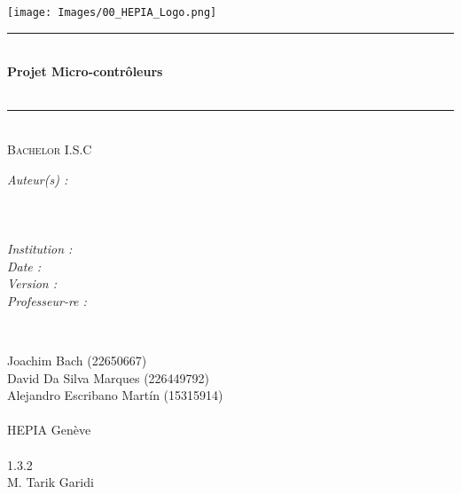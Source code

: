 \documentclass[french, 11pt]{article}
\title{\DocSubject}
\author{Joachim BACH ; David DA SILVA MARQUES}
\date{\today}
\makeatletter
\newcommand{\DocVersion}{1.3.2}
\newcommand{\DocTitle}{Projet Micro-contrôleurs}
\newcommand{\SubjectProfessor}{M. Tarik Garidi\xspace}
\let\TheTitle\@title
\let\TheDate\@date
\makeatother
\begin{document}
	
	\normalsize
	
	\begin{titlepage}
		
		\centering
		\vspace*{2.0 cm}
		
		\texttt{[image: Images/00\_HEPIA\_Logo.png]}\\[1.0 cm]
		
		\vspace{1.0 cm}
		
		\rule{\linewidth}{0.3 mm} \\[0.2 cm]
		{\Huge \textbf{\DocTitle}}\\
		\vspace{4 mm}
		{\huge \TheTitle}\\
		\rule{\linewidth}{0.3 mm} \\[1.2 cm]
		
		\textsc{\Large Bachelor I.S.C}\\[0.5 cm]
		
		\vspace{1.5 cm}
		
		\begin{minipage}{0.40\textwidth}
			
			\begin{flushleft}
				\Large\emph{Auteur(s) :}\\[0.2 cm]
				\Large\emph{}\\[0.2 cm]
				\Large\emph{}\\[0.2 cm]
				\Large\emph{}\\[0.2 cm]
				\Large\emph{Institution :}\\[0.2 cm]
				\Large\emph{Date :}\\[0.2 cm]
				\Large\emph{Version :}\\[0.2 cm]
				\Large\emph{Professeur-re :}\\[0.2 cm]
			\end{flushleft}
		
		\end{minipage}~
		\begin{minipage}{0.53\textwidth}
			
			\begin{flushright}
				\Large{Joachim Bach (22650667)}\\[0.2 cm]
				\Large{David Da Silva Marques (226449792)}\\[0.2 cm]
				\Large{Alejandro Escribano Martín (15315914)}\\[0.2 cm]
				\Large\emph{}\\[0.2 cm]
				\Large{HEPIA Genève}\\[0.2 cm]
				\Large{\TheDate}\\[0.2 cm]
				\Large{\DocVersion}\\[0.2 cm]
				\Large{\SubjectProfessor}\\[0.2 cm]
			\end{flushright}
		
		\end{minipage}
	
	\end{titlepage}
	
\end{document}
